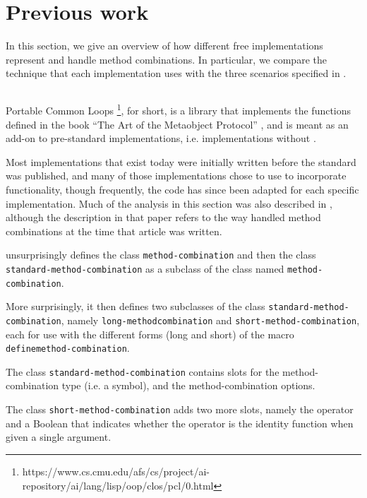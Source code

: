 \section{Previous work}

In this section, we give an overview of how different free
\commonlisp{} implementations represent and handle method
combinations.  In particular, we compare the technique that each
implementation uses with the three scenarios specified in
.

\subsection{\pcl{}}
\label{sec-pcl}

Portable Common Loops%
\footnote{https://www.cs.cmu.edu/afs/cs/project/ai-repository/ai/lang/lisp/oop/clos/pcl/0.html},
\pcl{} for short, is a library that implements
the functions defined in the book ``The Art of the Metaobject
Protocol'' \cite{Kiczales:1991:AMP:574212}, and is meant as an add-on
to pre-standard \commonlisp{} implementations, i.e. implementations
without \clos{}.

Most \commonlisp{} implementations that exist today were initially
written before the standard was published, and many of those
implementations chose to use \pcl{} to incorporate \clos{}
functionality, though frequently, the code has since been adapted for
each specific implementation.  Much of the analysis in this section
was also described in \cite{verna.18.els}, although the description in
that paper refers to the way \sbcl{} handled method combinations at
the time that article was written.

\pcl{} unsurprisingly defines the class \texttt{method\--combination}
and then the class \texttt{standard\--method\--combination} as a
subclass of the class named \texttt{method\--combination}.

More surprisingly, it then defines two subclasses of the class
\texttt{standard\--method\--combination}, namely
\texttt{long\--method\-combination} and
\texttt{short\--method\--combination}, each for use with the different
forms (long and short) of the macro
\texttt{define\-method\--combination}.

The class \texttt{standard-method-combination} contains slots for the
method-combination type (i.e. a symbol), and the method-combination
options.

The class \texttt{short-method-combination} adds two more slots,
namely the operator and a Boolean that indicates whether the operator
is the identity function when given a single argument.

